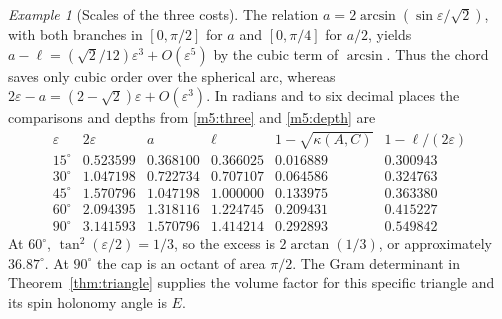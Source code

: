 \documentclass[11pt,reqno]{amsart}
\theoremstyle{definition}
\theoremstyle{remark}
\newtheorem{example}[theorem]{Example}
\numberwithin{equation}{section}
\begin{document}
\begin{example}[Scales of the three costs]\label{m5:scales}
The relation \(a=2\arcsin(\sin\varepsilon/\sqrt2)\), with both branches
in \([0,\pi/2]\) for \(a\) and \([0,\pi/4]\) for \(a/2\), yields
\(a-\ell=(\sqrt2/12)\varepsilon^3+O(\varepsilon^5)\) by the cubic
term of \(\arcsin\). Thus the chord saves only cubic order over the
spherical arc, whereas \(2\varepsilon-a=(2-\sqrt2)\varepsilon+
O(\varepsilon^3)\). In radians and to six decimal places the comparisons
and depths from \eqref{m5:three} and \eqref{m5:depth} are
\[
\begin{array}{c|rrrrr}
\varepsilon & 2\varepsilon & a & \ell & 1-\sqrt{\kappa(A,C)}
 & 1-\ell/(2\varepsilon)\\ \hline
15^\circ &0.523599&0.368100&0.366025&0.016889&0.300943\\
30^\circ &1.047198&0.722734&0.707107&0.064586&0.324763\\
45^\circ &1.570796&1.047198&1.000000&0.133975&0.363380\\
60^\circ &2.094395&1.318116&1.224745&0.209431&0.415227\\
90^\circ &3.141593&1.570796&1.414214&0.292893&0.549842
\end{array}
\]
At \(60^\circ\), \(\tan^2(\varepsilon/2)=1/3\), so the excess is
\(2\arctan(1/3)\), or approximately \(36.87^\circ\). At \(90^\circ\) the
cap is an octant of area \(\pi/2\). The Gram determinant in
Theorem~\ref{thm:triangle} supplies the volume factor for this specific
triangle and its spin holonomy angle is \(E\).
\end{example}
\end{document}
